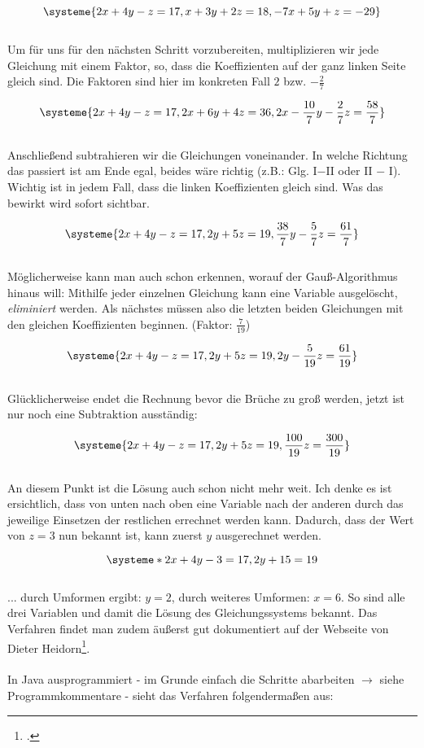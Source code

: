 \[ %
\systeme{
	2x  +  4y  -   z  =  17,
	 x  +  3y  +  2z  =  18,
	-7x +  5y  +   z  = -29}
\]
\ \\
Um für uns für den nächsten Schritt vorzubereiten, multiplizieren wir jede Gleichung mit einem Faktor, so, dass die Koeffizienten auf der ganz linken Seite gleich sind. Die Faktoren sind hier im konkreten Fall $2$ bzw. $-\frac{2}{7}$

\[ %
\systeme{
	2x  +  4y  -   z  =  17,
	2x  +  6y  +  4z  =  36,
	2x - \frac{10}{7}y - \frac{2}{7}z = \frac{58}{7}}
\]
\ \\
Anschließend subtrahieren wir die Gleichungen voneinander. In welche Richtung das passiert ist am Ende egal, beides wäre richtig (z.B.: Glg. I$-$II oder II $-$ I). Wichtig ist in jedem Fall, dass die linken Koeffizienten gleich sind. Was das bewirkt wird sofort sichtbar.

\[ %
\systeme{
	2x  +  4y  -   z  =  17,
	       2y  +  5z  =  19,
		   \frac{38}{7}y  -  \frac{5}{7}z  = \frac{61}{7}}
\]
\ \\
Möglicherweise kann man auch schon erkennen, worauf der Gauß-Algorithmus hinaus will: Mithilfe jeder einzelnen Gleichung kann eine Variable ausgelöscht, \textit{eliminiert} werden. Als nächstes müssen also die letzten beiden Gleichungen mit den gleichen Koeffizienten beginnen. (Faktor: $\frac{7}{19}$)

\[ %
\systeme{
	2x  +  4y  -   z  =  17,
		   2y  +  5z  =  19,
		   2y  -  \frac{5}{19}z  = \frac{61}{19}}
\]
\ \\
Glücklicherweise endet die Rechnung bevor die Brüche zu groß werden, jetzt ist nur noch eine Subtraktion ausständig:

\[ %
\systeme{
	2x  +  4y  -   z  =  17,
		2y  +  5z  =  19,
			\frac{100}{19}z  = \frac{300}{19}}
\]
\ \\
An diesem Punkt ist die Lösung auch schon nicht mehr weit. Ich denke es ist ersichtlich, dass von unten nach oben eine Variable nach der anderen durch das jeweilige Einsetzen der restlichen errechnet werden kann. Dadurch, dass der Wert von $z=3$ nun bekannt ist, kann zuerst $y$ ausgerechnet werden.

\[ %
\systeme*{
	2x  +  4y  -   3  =  17,
		2y  +  15  =  19}
\]
\ \\
... durch Umformen ergibt: $y=2$, durch weiteres Umformen: $x=6$. So sind alle drei Variablen und damit die Lösung des Gleichungssystems bekannt. Das Verfahren findet man zudem äußerst gut dokumentiert auf der Webseite von Dieter Heidorn\footcite{math_gauss_verfahren}.\\ %
\\
In Java ausprogrammiert - im Grunde einfach die Schritte abarbeiten $\rightarrow$ siehe Programmkommentare - sieht das Verfahren folgendermaßen aus:

